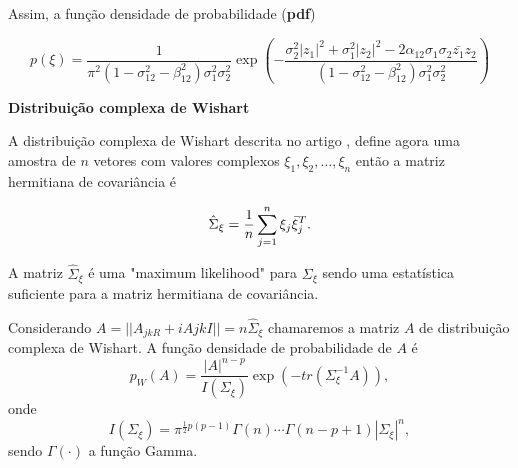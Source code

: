 Assim, a função densidade de probabilidade ({\bf pdf}) 

\begin{equation}\label{eqn79}
	p(\xi)=\frac{1}{\pi^2(1 - \sigma_{12}^{2}- \beta_{12}^2)\sigma_{1}^2\sigma_{2}^2}\exp\left(-\frac{\sigma_2^2|z_1|^2+\sigma_1^2|z_2|^2-2\alpha_{12}\sigma_1\sigma_2\bar{z_1}z_2}{(1 - \sigma_{12}^{2}- \beta_{12}^2)\sigma_{1}^2\sigma_{2}^2}
\right)  
\end{equation}

{\bf Distribuição complexa de Wishart}

A distribuição complexa de Wishart descrita no artigo \cite{good}, define agora uma amostra de  $n$ vetores com valores complexos $\xi_1,\xi_2,\dots,\xi_n$ então a matriz hermitiana de covariância é 

\begin{equation}\label{eqn80}
	\hat{\Sigma}_{\xi}=\frac{1}{n}\sum_{j=1}^{n}\xi_j\bar{\xi}_{j}^{T} . \\
\end{equation}

A matriz $\hat{\Sigma}_{\xi}$ é uma "maximum likelihood" para $\Sigma_{\xi}$ sendo uma estatística suficiente para a matriz hermitiana de covariância.

Considerando $A=||A_{jkR}+iA{jkI}||=n\hat{\Sigma}_{\xi}$ chamaremos a matriz $A$ de distribuição complexa de Wishart. A função densidade de probabilidade de $A$ é
\begin{equation}\label{eqn81}
	p_W(A)=\frac{|A|^{n-p}}{I(\Sigma_{\xi})} \exp(-tr(\Sigma_{\xi}^{-1}A)), 
\end{equation}
onde
\begin{equation}\label{eqn82}
	I(\Sigma_{\xi})=\pi^{\frac{1}{2}p(p-1)}\Gamma(n)\cdots\Gamma(n-p+1)|\Sigma_{\xi}|^n, 
\end{equation}
sendo $\Gamma(\cdot)$ a função Gamma.



